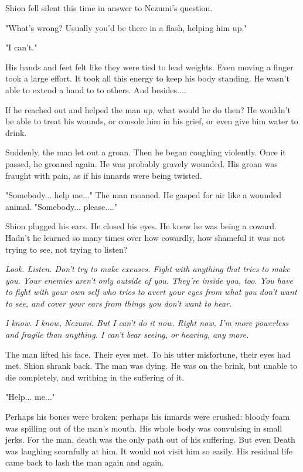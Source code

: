 Shion fell silent this time in answer to Nezumi's question.

"What's wrong? Usually you'd be there in a flash, helping him up."

"I can't."

His hands and feet felt like they were tied to lead weights. Even moving
a finger took a large effort. It took all this energy to keep his body
standing. He wasn't able to extend a hand to to others. And besides....

If he reached out and helped the man up, what would he do then? He
wouldn't be able to treat his wounds, or console him in his grief, or
even give him water to drink.

Suddenly, the man let out a groan. Then he began coughing violently.
Once it passed, he groaned again. He was probably gravely wounded. His
groan was fraught with pain, as if his innards were being twisted.

"Somebody... help me..." The man moaned. He gasped for air like a
wounded animal. "Somebody... please...."

Shion plugged his ears. He closed his eyes. He knew he was being a
coward. Hadn't he learned so many times over how cowardly, how shameful
it was not trying to see, not trying to listen?

\emph{Look. Listen. Don't try to make excuses. Fight with anything that tries
to make you. Your enemies aren't only outside of you. They're inside
you, too. You have to fight with your own self who tries to avert your
eyes from what you don't want to see, and cover your ears from things
you don't want to hear.}

\emph{I know. I know, Nezumi. But I can't do it now. Right now, I'm more
powerless and fragile than anything. I can't bear seeing, or hearing,
any more.}

The man lifted his face. Their eyes met. To his utter misfortune, their
eyes had met. Shion shrank back. The man was dying. He was on the brink,
but unable to die completely, and writhing in the suffering of it.

"Help... me..."

Perhaps his bones were broken; perhaps his innards were crushed: bloody
foam was spilling out of the man's mouth. His whole body was convulsing
in small jerks. For the man, death was the only path out of his
suffering. But even Death was laughing scornfully at him. It would not
visit him so easily. His residual life came back to lash the man again
and again.


